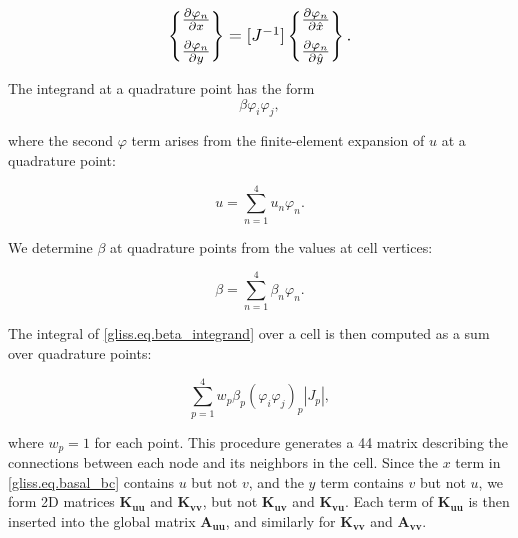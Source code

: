 \begin{equation}
  \label{gliss.eq.reference_to_real_2d}
  \scalebox{1.2}{
    $
  \left\{ \begin{matrix}
     \frac{\partial {{\varphi }_{n}}}{\partial x}  \\[6pt]
     \frac{\partial {{\varphi }_{n}}}{\partial y}  \\
  \end{matrix} \right\} =
          [J^{-1}]  \left\{ \begin{matrix}
    \frac{\partial {{\varphi }_{n}}}{\partial \hat{x}}  \\[6pt]
    \frac{\partial {{\varphi }_{n}}}{\partial \hat{y}}  \\
  \end{matrix} \right\}. 
          $
          }
\end{equation}

The integrand at a quadrature point has the form
\begin{equation}
  \label{gliss.eq.beta_integrand}
  \beta \varphi_i \varphi_j,
\end{equation}

\noindent
where the second $\varphi$ term arises from the finite-element expansion of $u$ at a quadrature point:

\begin{equation}
  u = \sum\limits_{n=1}^{4} {u_n \varphi_n}.
\end{equation}

\noindent
We determine $\beta$ at quadrature points from the values at cell vertices:

\begin{equation}
  \beta = \sum\limits_{n=1}^{4} {\beta_n \varphi_n}.
\end{equation}

\noindent
The integral of \eqref{gliss.eq.beta_integrand} over a cell is then computed as a sum over quadrature points:

\begin{equation}
  \label{gliss.eq.sum_over_qp_beta}
  \sum\limits_{p=1}^{4} {w_p \beta_p (\varphi_i \varphi_j)_p |J_p|},
\end{equation}

\noindent
where $w_p = 1$ for each point.  This procedure generates a 44 matrix
describing the connections between each node and its neighbors in the cell.
Since the $x$ term in \eqref{gliss.eq.basal_bc} 
contains $u$ but not $v$, and the $y$ term contains
$v$ but not $u$, we form 2D matrices $\mathbf{K_{uu}}$ and $\mathbf{K_{vv}}$, but not $\mathbf{K_{uv}}$ and $\mathbf{K_{vu}}$.
Each term of $\mathbf{K_{uu}}$ is then inserted into the global matrix $\mathbf{A_{uu}}$, and
similarly for $\mathbf{K_{vv}}$ and $\mathbf{A_{vv}}$.

